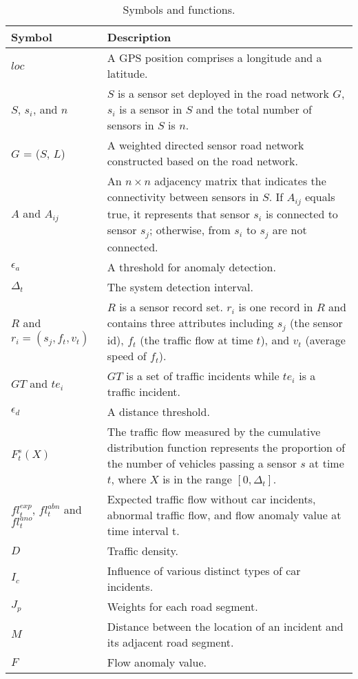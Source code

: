\begin{table}[!h]
\begin{center}
\footnotesize{
\captionsetup{width=3in}
\caption{Symbols and functions.}
\label{tab:symbols}
\begin{tabular}{|p{50pt}|p{180pt}|}
\hline
\textbf{Symbol} & \textbf{Description} \\                                                                                                                                
\hline
$loc$  & A GPS position comprises a longitude and a latitude. \\ 
\hline
$S$, $s_i$, and $n$  & $S$  is a sensor set deployed in the road network $G$, $s_i$ is a sensor in $S$ and the total number of sensors in $S$ is $n$.\\ 
\hline
$G$ = ($S$, $L$) & A weighted directed sensor road network constructed based on the road network. \\ 
\hline
$A$ and $A_{ij}$& An $n \times n$ adjacency matrix that indicates the connectivity between sensors in $S$. If $A_{ij}$ equals true, it represents that sensor $s_i$ is connected to sensor $s_j$; otherwise, from $s_i$ to $s_j$ are not connected. \\
\hline
$\epsilon_a$ & A threshold for anomaly detection. \\
\hline
$\Delta_t$ &  The system detection interval. \\
\hline
$R$ and $r_i=(s_j, f_t, v_t)$ & $R$ is a sensor record set. $r_i$ is one record in $R$ and contains three attributes including $s_j$ (the sensor id), $f_t$ (the traffic flow at time $t$), and $v_t$ (average speed of $f_t$).  \\
\hline
$GT$ and $te_i$ &  $GT$ is a set of traffic incidents while $te_i$ is a traffic incident. \\
\hline
$\epsilon_d$ & A distance threshold.\\ 
\hline
$F_{t}^{s}(X)$ & The traffic flow measured by the cumulative distribution function represents the proportion of the number of vehicles passing a sensor $s$ at time $t$, where $X$ is in the range $[0, \Delta_t]$. \\
\hline
$fl_t^{exp}$, $fl_t^{abn}$ and $fl_t^{ano}$ & Expected traffic flow without car incidents, abnormal traffic flow, and flow anomaly value at time interval t. \\
\hline
$D$ & Traffic density. \\
\hline
$I_c$ & Influence of various distinct types of car incidents. \\
\hline
$J_p$ & Weights for each road segment. \\
\hline
$M$ & Distance between the location of an incident and its adjacent road segment. \\
\hline
$F$ & Flow anomaly value. \\
\hline
\end{tabular}
\label{tab:Symbols}}
\end{center}
\end{table}

